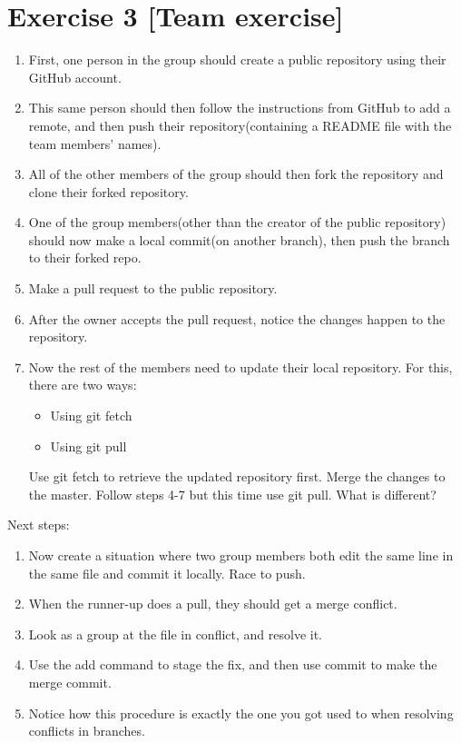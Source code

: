 \documentclass{article}
\begin{document}
	\section{Exercise 3 [Team exercise]}
	\begin{enumerate}
		\item First, one person in the group should create a public repository using their GitHub account.
		\item This same person should then follow the instructions from GitHub to add a remote, and then push their repository(containing a README file with the team members' names).
		\item All of the other members of the group should then fork the repository and clone their forked repository.
		\item One of the group members(other than the creator of the public repository) should now make a local commit(on another branch), then push the branch to their forked repo.
		\item Make a pull request to the public repository. 
		\item After the owner accepts the pull request, notice the changes happen to the repository.
		\item Now the rest of the members need to update their local repository. For this, there are two ways:
		\begin{itemize}
			\item Using git fetch
			\item Using git pull
		\end{itemize}
		Use git fetch to retrieve the updated repository first. Merge the changes to the master. Follow steps 4-7 but this time use git pull. What is different? 
	\end{enumerate}	
		Next steps:
\begin{enumerate}
	\item Now create a situation where two group members both edit the same line in the same file
	and commit it locally. Race to push.
	\item When the runner-up does a pull, they should get a merge conflict.
	\item Look as a group at the file in conflict, and resolve it.
	\item Use the add command to stage the fix, and then use commit to make the merge commit.
	\item Notice how this procedure is exactly the one you got used to when resolving conflicts in	branches.
\end{enumerate}	
	
\end{document}
